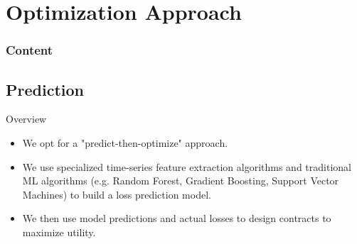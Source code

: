 \documentclass{beamer}
\begin{document}

\section{Optimization Approach}
\begin{frame}
    \frametitle{Content}
    \tableofcontents[currentsection]
  \end{frame}
\subsection{Prediction}
\begin{frame}{Overview}
    \begin{itemize}
        \setlength\itemsep{2em}
        \item We opt for a "predict-then-optimize" approach.
        \item We use specialized time-series feature extraction algorithms and traditional ML algorithms (e.g. Random Forest, Gradient Boosting, Support Vector Machines) to build a loss prediction model.
        \item We then use model predictions and actual losses to design contracts to maximize utility. 
    \end{itemize}
\end{frame}
\end{document}
